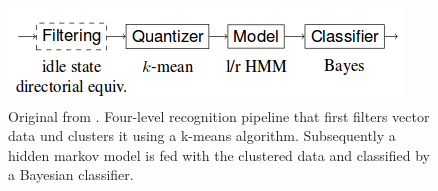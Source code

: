 \begin{figure}[bth]
	\myfloatalign
	\includegraphics[width=.99\linewidth]{img/wiigeePipeline.png}
	\caption{Original from \cite{Schlomer:2008:GRW:1347390.1347395}. Four-level recognition pipeline that first filters vector data und clusters it using a k-means algorithm. Subsequently a hidden markov model is fed with the clustered data and classified by a Bayesian classifier.}
	\label{fig:wiigeePipeline}
\end{figure}









